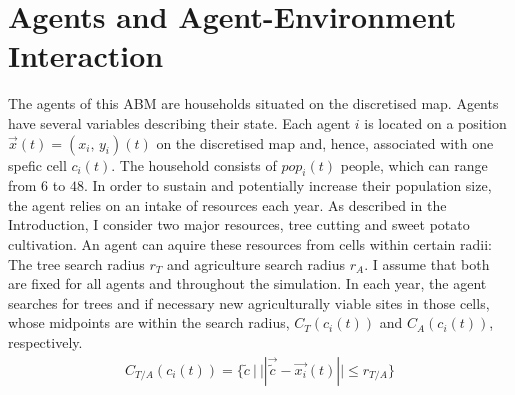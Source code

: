 \section{Agents and Agent-Environment Interaction}\label{sec:AgentUpdate}
The agents of this ABM are households situated on the discretised map.
Agents have several variables describing their state.
Each agent $i$ is located on a position $\vec{x}(t) = (x_i,\, y_i)(t)$ on the discretised map and, hence, associated with one spefic cell $c_i(t)$.
The household consists of $pop_i(t)$ people, which can range from $6$ to $48$.
In order to sustain and potentially increase their population size, the agent relies on an intake of resources each year.
As described in the Introduction, I consider two major resources, tree cutting and sweet potato cultivation.
An agent can aquire these resources from cells within certain radii: The tree search radius $r_T$ and agriculture search radius $r_A$. 
I assume that both are fixed for all agents and throughout the simulation.
In each year, the agent searches for trees and if necessary new agriculturally viable sites in those cells, whose midpoints are within the search radius, $C_T(c_i(t))$ and $C_A(c_i(t))$, respectively.
\begin{eqnarray}\label{eq:Circle}
C_{T/A}(c_i(t)) = \{ \tilde{c}\ | \   | |  \vec{\tilde{c}} - \vec{x_i}(t)
| |  \leq r_{T/A} \}
\end{eqnarray}

